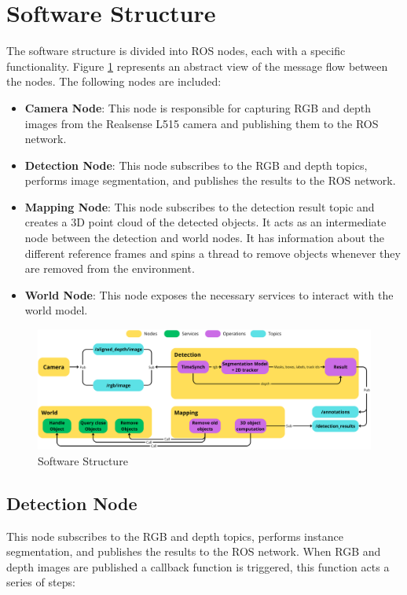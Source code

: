 \section{Software Structure}
The software structure is divided into ROS nodes, each with a specific functionality. 
Figure \ref{fig:software_structure} represents an abstract view of the message flow between the nodes. 
The following nodes are included:
\begin{itemize}
    \setlength{\itemsep}{1pt}
    \setlength{\parskip}{1pt}
    \setlength{\topsep}{1pt}
    \item \textbf{Camera Node}: This node is responsible for capturing RGB and depth images from the Realsense L515 camera and publishing them to the ROS network.
    \item \textbf{Detection Node}: This node subscribes to the RGB and depth topics, performs image segmentation, and publishes the results to the ROS network.
    \item \textbf{Mapping Node}: This node subscribes to the detection result topic and creates a 3D point cloud of the detected objects. It acts as an intermediate node between the detection and world nodes. It has information about the different reference frames and spins a thread to remove objects whenever they are removed from the environment.
    \item \textbf{World Node}: This node exposes the necessary services to interact with the world model.
\end{itemize}

\begin{figure}[H] %
    \centering
    \includegraphics[width=1.0\textwidth]{figs/SW-struct.png}
    \caption{Software Structure}
    \label{fig:software_structure}
\end{figure}

\subsection[Detection Node]{Detection Node}
This node subscribes to the RGB and depth topics, performs instance segmentation, and publishes the results to the ROS network.
When RGB and depth images are published a callback function is triggered, this function acts a series of steps:
